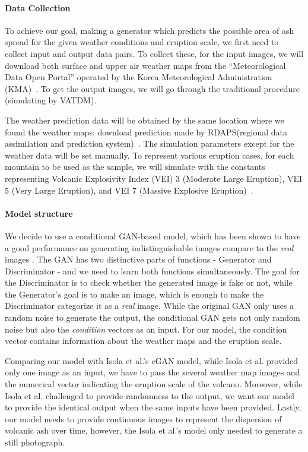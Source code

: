 \documentclass{article}
\begin{document}
\begin{doublespacing}
{  \paragraph{Data Collection}
  To achieve our goal, making a generator which predicts the possible area of ash spread for the 
  given weather conditions and eruption scale, we first need to collect input and output data pairs.
  To collect these, for the input images, we will download both surface and upper air weather maps 
  from the “Meteorological Data Open Portal” operated by the Korea Meteorological Administration 
  (KMA)~\cite{MDOP}. To get the output images, we will go through the traditional procedure 
  (simulating by VATDM).
  
  The weather prediction data will be obtained by the same location where we found the weather maps:
  download prediction made by RDAPS(regional data assimilation and prediction system)~\cite{MDOP}.
  The simulation parameters except for the weather data will be set manually. To represent various 
  eruption cases, for each mountain to be used as the sample, we will simulate with the constants 
  representing Volcanic Explosivity Index (VEI) 3 (Moderate Large Eruption), VEI 5 (Very Large 
  Eruption), and VEI 7 (Massive Explosive Eruption)~\cite[p.1232]{Newhall1982}. 

  \paragraph{Model structure}
  We decide to use a conditional GAN-based model, which has been shown to have a good performance on 
  generating indistinguishable images compare to the \emph{real} images 
  \cite{isola2016imagetoimage}. The GAN has two distinctive parts of functions - Generator and 
  Discriminator - and we need to learn both functions simultaneously. The goal for the Discriminator 
  is to check whether the generated image is fake or not, while the Generator's goal is to make an 
  image, which is enough to make the Discriminator categorize it as a \emph{real} image. While the 
  original GAN only uses a random noise to generate the output, the conditional GAN gets not only 
  random noise but also the \emph{condition} vectors as an input. For our model, the condition 
  vector contains information about the weather maps and the eruption scale.

  Comparing our model with Isola et al.\cite{isola2016imagetoimage}'s cGAN model, while Isola et 
  al. provided only one image as an input, we have to pass the several weather map images and the 
  numerical vector indicating the eruption scale of the volcano. Moreover, while Isola et 
  al.\cite{isola2016imagetoimage} challenged to provide randomness to the output, we want our model 
  to provide the identical output when the same inputs have been provided. Lastly, our model needs 
  to provide continuous images to represent the dispersion of volcanic ash over time, however, the 
  Isola et al.\cite{isola2016imagetoimage}'s model only needed to generate a still photograph.

}
\end{doublespacing}
\end{document}
